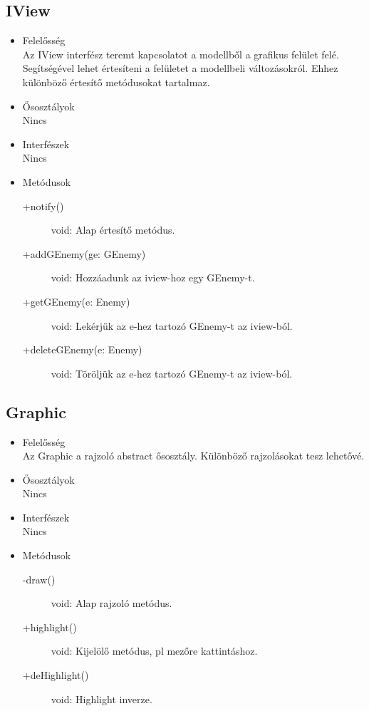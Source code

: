 \subsection{IView}
\begin{itemize}
\item Felelősség\\
Az IView interfész teremt kapcsolatot a modellből a grafikus felület felé. Segítségével lehet értesíteni a felületet a modellbeli változásokról. Ehhez különböző értesítő metódusokat tartalmaz.
\item Ősosztályok\\
Nincs
\item Interfészek\\
Nincs
\item Metódusok
	\begin{description}
		\item[+notify()] void: Alap értesítő metódus.
		\item[+addGEnemy(ge: GEnemy)] void: Hozzáadunk az iview-hoz egy GEnemy-t.
		\item[+getGEnemy(e: Enemy)] void: Lekérjük az e-hez tartozó GEnemy-t az iview-ból.
		\item[+deleteGEnemy(e: Enemy)] void: Töröljük az e-hez tartozó GEnemy-t az iview-ból.
	\end{description}
\end{itemize}

\subsection{Graphic}
\begin{itemize}
\item Felelősség\\
Az Graphic a rajzoló abstract ősosztály. Különböző rajzolásokat tesz lehetővé.
\item Ősosztályok\\
Nincs
\item Interfészek\\
Nincs
\item Metódusok
	\begin{description}
		\item[-draw()] void: Alap rajzoló metódus.
		\item[+highlight()] void: Kijelölő metódus, pl mezőre kattintáshoz.
		\item[+deHighlight()] void: Highlight inverze.
	\end{description}
\end{itemize}

